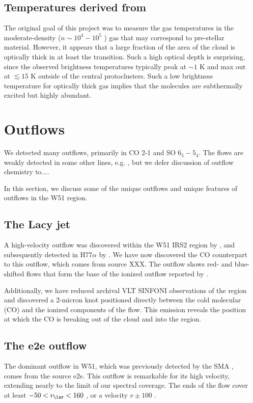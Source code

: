 \documentclass{aa}
\begin{document}
\clearpage

\subsection{Temperatures derived from \formaldehyde}
The original goal of this project was to measure the gas temperatures in the
moderate-density ($n\sim10^4-10^5$ \percc) gas that may correspond to
pre-stellar material.  However, it appears that a large fraction of the area
of the cloud is optically thick in at least the \formaldehyde \threeohthree
transition.  Such a high optical depth is surprising, since the observed
brightness temperatures typically peak at $\sim1$ K and max out at $\lesssim15$
K outside of the central protoclusters.  Such a low brightness temperature for 
optically thick gas implies that the molecules are subthermally excited
but highly abundant.

\section{Outflows}
\label{sec:outflows}
We detected many outflows, primarily in CO 2-1 and SO $6_5-5_4$.  The flows are weakly detected in some
other lines, e.g. \formaldehyde, but we defer discussion of outflow chemistry to....

In this section, we discuss some of the unique outflows and unique features of
outflows in the W51 region.  

\subsection{The Lacy jet}
A high-velocity outflow was discovered within the W51 IRS2 region by
\citet{Lacy2007a}, and subsequently detected in H77$\alpha$ by
\citet{Ginsburg2016b}.  We have now discovered the CO counterpart to this
outflow, which comes from source XXX.   The outflow shows red- and blue-shifted
flows that form the base of the ionized outflow reported by \citet{Lacy2007a}.

Additionally, we have reduced archival VLT SINFONI observations of the region
and discovered a 2-micron \hh knot positioned directly between the cold
molecular (CO) and the ionized components of the flow.  This \hh emission
reveals the position at which the CO is breaking out of the cloud and into the
\hii region.

\subsection{The e2e outflow}
The dominant outflow in W51, which was previously detected by the SMA \citep{},
comes from the source e2e.  This outflow is remarkable for its high velocity,
extending nearly to the limit of our spectral coverage.  The ends of the flow
cover at least $-50 < v_{\lsr} < 160$ \kms, or a velocity $v\pm100$ \kms.  
\end{document}
